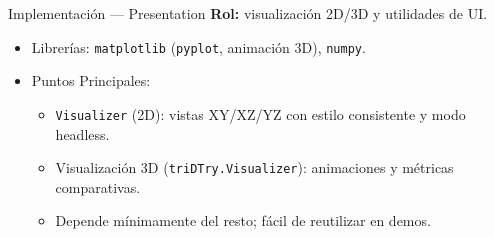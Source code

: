 \begin{frame}{Implementación — Presentation}
    \textbf{Rol:} visualización 2D/3D y utilidades de UI.
    \vspace{0.2cm}
    \begin{itemize}
        \item Librerías: \texttt{matplotlib} (\texttt{pyplot}, animación 3D), \texttt{numpy}.
        \item Puntos Principales:
        \begin{itemize}
            \item \texttt{Visualizer} (2D): vistas XY/XZ/YZ con estilo consistente y modo headless.
            \item Visualización 3D (\texttt{triDTry.Visualizer}): animaciones y métricas comparativas.
            \item Depende mínimamente del resto; fácil de reutilizar en demos.
        \end{itemize}
    \end{itemize}
\end{frame}

